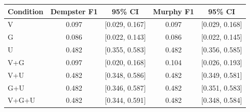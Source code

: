 \begin{tabular}{lcccc}
\toprule
Condition & Dempster F1 & 95\% CI & Murphy F1 & 95\% CI \\
\midrule
V & 0.097 & [0.029, 0.167] & 0.097 & [0.029, 0.168] \\
G & 0.086 & [0.022, 0.143] & 0.086 & [0.022, 0.145] \\
U & 0.482 & [0.355, 0.583] & 0.482 & [0.356, 0.585] \\
V+G & 0.097 & [0.020, 0.168] & 0.104 & [0.026, 0.193] \\
V+U & 0.482 & [0.348, 0.586] & 0.482 & [0.349, 0.581] \\
G+U & 0.482 & [0.346, 0.587] & 0.482 & [0.351, 0.583] \\
V+G+U & 0.482 & [0.344, 0.591] & 0.482 & [0.348, 0.584] \\
\bottomrule
\end{tabular}